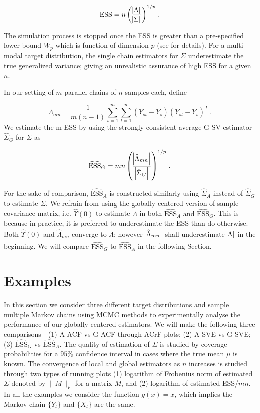 \documentclass[11pt]{article}
\theoremstyle{remark}
\begin{document}
\[
\textrm{ESS} = n \left(\dfrac{\abs{\Lambda}}{\abs{\Sigma}}\right)^{1/p}\, .
\]

The simulation process is stopped once the ESS is greater than a pre-specified lower-bound $W_{p}$ which is function of dimension $p$ (see \cite{vats2019multivariate} for details). For a multi-modal target distribution, the single chain estimators for $\Sigma$ underestimate the true generalized variance; giving an unrealistic assurance of high ESS for a given $n$. 

In our setting of $m$ parallel chains of $n$ samples each, define

\[
\hat{\Lambda}_{mn} = \dfrac{1}{m(n-1)}\sum_{s=1}^{m}\sum_{t=1}^{n}(Y_{st} - \bar{Y}_s)(Y_{st} - \bar{Y}_s)^T\, .
\]
We estimate the m-ESS by using the strongly consistent average G-SV estimator $\hat{\Sigma}_G$ for $\Sigma$ as

\[
\widehat{\textrm{ESS}}_G = mn\left(\dfrac{\abs{\hat{\Lambda}_{mn}}}{\abs{\hat{\Sigma}_{G}}}\right)^{1/p}\, .
\]

For the sake of comparison, $\widehat{\textrm{ESS}}_A$ is constructed similarly using $\hat{\Sigma}_A$ instead of $\hat{\Sigma}_G$ to estimate $\Sigma$. We refrain from using the globally centered version of sample covariance matrix, i.e. $\hat{\Upsilon}(0)$ to estimate $\Lambda$ in both $\widehat{\textrm{ESS}}_A \textrm{ and } \widehat{\textrm{ESS}}_G $. This is because in practice, it is preferred to underestimate the ESS than do otherwise. Both $\hat{\Upsilon}(0)$ and $\hat{\Lambda}_{mn}$ converge to $\Lambda$; however $\abs{\hat{\Lambda}_{mn}}$ shall underestimate $\abs{\Lambda}$ in the beginning. We will compare $\widehat{\textrm{ESS}}_G$ to $\widehat{\textrm{ESS}}_A$ in the following Section.


\section{Examples} \label{sec:examples}

In this section we consider three different target distributions and sample multiple Markov chains using MCMC methods to experimentally analyse the performance of our globally-centered estimators. We will make the following three comparisons - (1) A-ACF vs G-ACF through ACrF plots; (2) A-SVE vs G-SVE; (3) $\widehat{\textrm{ESS}}_G$ vs $\widehat{\textrm{ESS}}_A$. The quality of estimation of $\Sigma$ is studied by coverage probabilities for a $95 \%$ confidence interval in cases where the true mean $\mu$ is known. The convergence of local and global estimators as $n$ increases is studied through two types of running plots (1) logarithm of Frobenius norm of estimated $\Sigma$ denoted by $\|M\|_F$ for a matrix $M$, and (2) logarithm of estimated ESS/$mn$. In all the examples we consider the function $g(x) = x$, which implies the Markov chain $\{Y_t\}$ and $\{X_t\}$ are the same.
\end{document}
